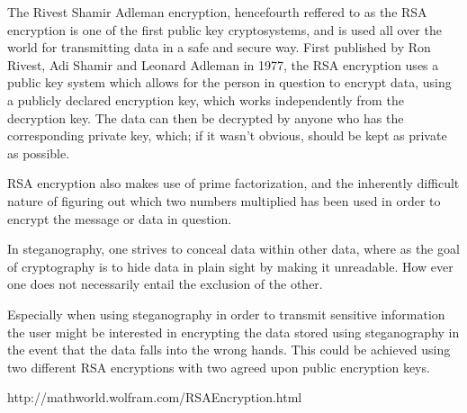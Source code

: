 The Rivest Shamir Adleman encryption, hencefourth reffered to as the RSA encryption is one of the first public key cryptosystems, and is used all over the world for transmitting data in a safe and secure way.
First published by Ron Rivest, Adi Shamir and Leonard Adleman in 1977, the RSA encryption uses a public key system which allows for the person in question to encrypt data, using a publicly declared encryption key, which works independently from the decryption key. The data can then be decrypted by anyone who has the corresponding private key, which; if it wasn't obvious, should be kept as private as possible.

RSA encryption also makes use of prime factorization, and the inherently difficult nature of figuring out which two numbers multiplied has been used in order to encrypt the message or data in question.

In steganography, one strives to conceal data within other data, where as the goal of cryptography is to hide data in plain sight by making it unreadable.
How ever one does not necessarily entail the exclusion of the other.

Especially when using steganography in order to transmit sensitive information the user might be interested in encrypting the data stored using steganography in the event that the data falls into the wrong hands.
This could be achieved using two different RSA encryptions with two agreed upon public encryption keys.

http://mathworld.wolfram.com/RSAEncryption.html